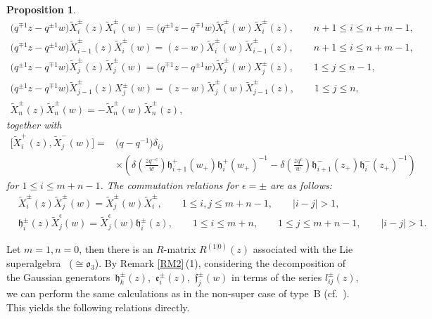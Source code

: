 \documentclass[10pt,a4paper]{amsart}
\numberwithin{equation}{section}
\newtheorem{Proposition}[Theorem]{Proposition}
 { \theoremstyle{definition}
\newtheorem{Definition}[Theorem]{Definition}
\newtheorem{Note}[Theorem]{Note}
\newtheorem{Example}[Theorem]{Example}
\newtheorem{Remark}[Theorem]{Remark} }
\begin{document}
\begin{Proposition}
\begin{gather*}
 \bigl(q^{\mp1}z-q^{\pm1}w\bigr)\widetilde{X}_i^{\pm}(z)\widetilde{X}_i^{\pm}(w)=\bigl(q^{\pm1}z-q^{\mp1}w\bigr)\widetilde{X}_i^{\pm}(w)\widetilde{X}_i^{\pm}(z),\qquad n+1\leq i\leq n+m-1,\\
 \bigl(q^{\mp1}z-q^{\pm1}w\bigr)\widetilde{X}_{i-1}^{\pm}(z)\widetilde{X}_{i}^{\pm}(w)=(z-w)\widetilde{X}_{i}^{\pm}(w)\widetilde{X}_{i-1}^{\pm}(z),\qquad n+1\leq i\leq n+m-1,\\
 \bigl(q^{\pm1}z-q^{\mp1}w\bigr)\widetilde{X}_j^{\pm}(z)\widetilde{X}_j^{\pm}(w)=\bigl(q^{\mp1}z-q^{\pm1}w\bigr)\widetilde{X}_j^{\pm}(w)X_j^{\pm}(z),\qquad 1\leq j\leq n-1,\\
 \bigl(q^{\pm1}z-q^{\mp1}w\bigr)\widetilde{X}_{j-1}^{\pm}(z)X_{j}^{\pm}(w)=(z-w)\widetilde{X}_{j}^{\pm}(w)\widetilde{X}_{j-1}^{\pm}(z),\qquad 1\leq j\leq n,\\
 \widetilde{X}_{n}^{\pm}(z)\widetilde{X}_{n}^{\pm}(w)=-\widetilde{X}_{n}^{\pm}(w)\widetilde{X}_{n}^{\pm}(z),
\end{gather*}
together with
\begin{align*}
 \bigl[\widetilde{X}_i^{+}(z), \widetilde{X}_j^{-}(w)\bigr]={}&\bigl(q-q^{-1}\bigr)\delta_{ij}\\
 &\times\left(\delta\left(\frac{zq^{-c}}{w}\right)\mathfrak{h}_{i+1}^+(w_+)
 \mathfrak{h}_i^+(w_+)^{-1}-\delta\left(\frac{zq^{c}}{w}\right)\mathfrak{h}_{i+1}^-(z_+)\mathfrak{h}_i^-(z_+)^{-1}\right)
\end{align*}
for $1\leq i\leq m+n-1$. The commutation relations for $\epsilon=\pm$ are as follows:
\begin{align*}
 &\widetilde{X}_i^{\pm}(z)\widetilde{X}_j^{\pm}(w)=\widetilde{X}_j^{\pm}(w)\widetilde{X}_i^{\pm}, \qquad 1\leq i,j \leq m+n-1,\qquad |i-j|>1,\\
 &\mathfrak{h}_i^{\pm}(z)\widetilde{X}_j^{\epsilon}(w)=\widetilde{X}_j^{\epsilon}(w)\mathfrak{h}_i^{\pm}(z), \qquad 1\leq i \leq m+n,\qquad 1\leq j \leq m+n-1,\qquad |i-j|>1.
\end{align*}
\end{Proposition}

Let $m=1, n=0$, then there is an $R$-matrix $R^{(1|0)}(z)$ associated with the Lie superalgebra~ ($\cong \mathfrak{o}_3$). By Remark \ref{RM2}\,(1), considering the decomposition of the Gaussian generators~$\mathfrak{h}_k^{\pm}(z)$,~$\mathfrak{e}_i^{\pm}(z)$,~$\mathfrak{f}_j^{\pm}(w)$ in terms of the series $l^{\pm}_{ij}(z)$, we can perform the same calculations as in the non-super case of type~B (cf.\ \cite[Lemmas 4.8--4.11]{JMAB}). This yields the following relations directly.
\end{document}

